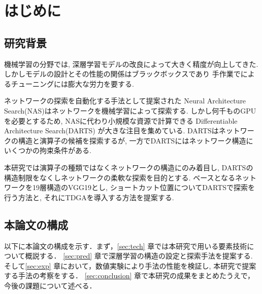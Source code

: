 \newpage
\changeindent{0cm}
\section{はじめに}
\label{sec:intro}
\changeindent{2cm}

\subsection{研究背景}

機械学習の分野では, 深層学習モデルの改良によって大きく精度が向上してきた.
しかしモデルの設計とその性能の関係はブラックボックスであり
手作業でによるチューニングには膨大な労力を要する.

ネットワークの探索を自動化する手法として提案された
Neural Architecture Search(NAS)はネットワークを機械学習によって探索する.
しかし何千ものGPUを必要とするため, NASに代わり小規模な資源で計算できる
Differentiable Architecture Search(DARTS) が大きな注目を集めている.
DARTSはネットワークの構造と演算子の候補を探索するが,
一方でDARTSにはネットワーク構造にいくつかの拘束条件がある.

本研究では演算子の種類ではなくネットワークの構造にのみ着目し,
DARTSの構造制限をなくしネットワークの柔軟な探索を目的とする.
ベースとなるネットワークを19層構造のVGG19とし,
ショートカット位置についてDARTSで探索を行う方法と, それにTDGAを導入する方法を提案する.

\subsection{本論文の構成}

以下に本論文の構成を示す．まず，\ref{sec:tech} 章では本研究で用いる要素技術について概説する．
\ref{sec:pred} 章で深層学習の構造の設定と探索手法を提案する.
そして\ref{sec:exp} 章において，数値実験により手法の性能を検証し, 本研究で提案する手法の考察をする．
\ref{sec:conclusion} 章で本研究の成果をまとめたうえで，今後の課題について述べる．


\begin{comment}
\end{comment}
